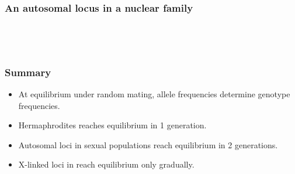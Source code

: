 \documentclass[12pt]{beamer}
\begin{document}
\begin{frame}
\frametitle{An autosomal locus in a nuclear family}
\begin{columns}
{\centering\\}

\bigskip

\pause
{}
\end{columns}

\bigskip

\end{frame}

\begin{frame}
\frametitle{Summary}
\begin{itemize}
\item At equilibrium under random mating, allele frequencies determine
  genotype frequencies.
\item Hermaphrodites reaches equilibrium in 1 generation.
\item Autosomal loci in sexual populations reach equilibrium in 2
  generations.
\item X-linked loci in reach equilibrium only gradually.
\end{itemize}
\end{frame}
\end{document}
